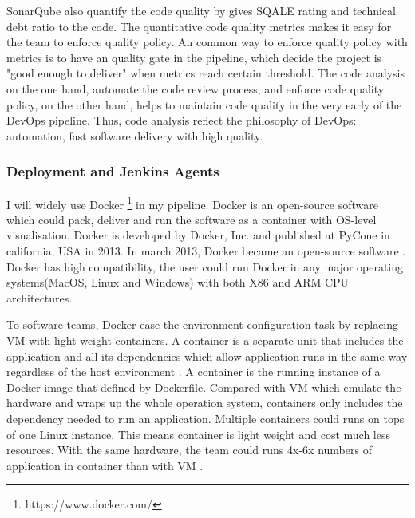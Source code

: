 SonarQube also quantify the code quality by gives SQALE rating and technical debt ratio to the code. The quantitative code quality metrics makes it easy for the team to enforce quality policy. An common way to enforce quality policy with metrics is to have an quality gate in the pipeline, which decide the project is "good enough to deliver" when metrics reach certain threshold.
The code analysis on the one hand, automate the code review process, and enforce code quality policy, on the other hand, helps to maintain code quality in the very early of the DevOps pipeline. Thus, code analysis reflect the philosophy of DevOps: automation, fast software delivery with high quality.
\subsubsection{Deployment and Jenkins Agents}
I will widely use Docker \footnote{https://www.docker.com/} in my pipeline.
Docker is an open-source software which could pack, deliver and run the software as a container with OS-level visualisation. Docker is developed by Docker, Inc. and published at PyCone in california, USA in 2013. In march 2013, Docker became an open-source software \cite{avram2013docker}. Docker has high compatibility, the user could run Docker in any major operating systems(MacOS, Linux and Windows) with both X86 and ARM CPU architectures.
\par
To software teams, Docker ease the environment configuration task by replacing VM with light-weight containers.
A container is a separate unit that includes the application and all its dependencies which allow application runs in the same way regardless of the host environment \cite{WhatisaC60:online}. A container is the running instance of a Docker image that defined by Dockerfile. Compared with VM which emulate the hardware and wraps up the whole operation system, containers only includes the dependency needed to run an application. Multiple containers could runs on tops of one Linux instance. This means container is light weight and cost much less resources. With the same hardware, the team could runs 4x-6x numbers of application in container than with VM \cite{vaughan2014docker}.

